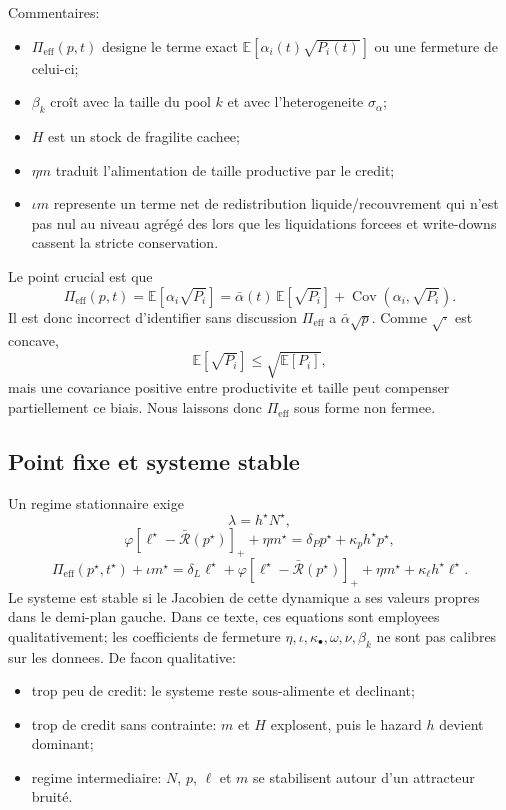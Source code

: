 \documentclass[11pt,a4paper]{article}
\begin{document}
Commentaires:
\begin{itemize}
\item $\Pi_{\mathrm{eff}}(p,t)$ designe le terme exact $\mathbb E[\alpha_i(t)\sqrt{P_i(t)}]$ ou une fermeture de celui-ci;
\item $\beta_k$ croît avec la taille du pool $k$ et avec l'heterogeneite $\sigma_\alpha$;
\item $H$ est un stock de fragilite cachee;
\item $\eta m$ traduit l'alimentation de taille productive par le credit;
\item $\iota m$ represente un terme net de redistribution liquide/recouvrement qui n'est pas nul au niveau agrégé des lors que les liquidations forcees et write-downs cassent la stricte conservation.
\end{itemize}

Le point crucial est que
\[
\Pi_{\mathrm{eff}}(p,t)=\mathbb E[\alpha_i\sqrt{P_i}]
= \bar \alpha(t)\,\mathbb E[\sqrt{P_i}] + \operatorname{Cov}(\alpha_i,\sqrt{P_i}).
\]
Il est donc incorrect d'identifier sans discussion $\Pi_{\mathrm{eff}}$ a $\bar \alpha\sqrt p$. Comme $\sqrt{\cdot}$ est concave,
\[
\mathbb E[\sqrt{P_i}] \le \sqrt{\mathbb E[P_i]},
\]
mais une covariance positive entre productivite et taille peut compenser partiellement ce biais. Nous laissons donc $\Pi_{\mathrm{eff}}$ sous forme non fermee.

\subsection{Point fixe et systeme stable}
Un regime stationnaire exige
\[
\lambda = h^\star N^\star,
\]
\[
\varphi[\ell^\star-\bar{\mathcal R}(p^\star)]_+ + \eta m^\star
=
\delta_P p^\star + \kappa_p h^\star p^\star,
\]
\[
\Pi_{\mathrm{eff}}(p^\star,t^\star) + \iota m^\star
=
\delta_L\ell^\star + \varphi[\ell^\star-\bar{\mathcal R}(p^\star)]_+ + \eta m^\star + \kappa_\ell h^\star \ell^\star.
\]
Le systeme est stable si le Jacobien de cette dynamique a ses valeurs propres dans le demi-plan gauche. Dans ce texte, ces equations sont employees qualitativement; les coefficients de fermeture $\eta,\iota,\kappa_\bullet,\omega,\nu,\beta_k$ ne sont pas calibres sur les donnees. De facon qualitative:
\begin{itemize}
\item trop peu de credit: le systeme reste sous-alimente et declinant;
\item trop de credit sans contrainte: $m$ et $H$ explosent, puis le hazard $h$ devient dominant;
\item regime intermediaire: $N$, $p$, $\ell$ et $m$ se stabilisent autour d'un attracteur bruité.
\end{itemize}
\end{document}
